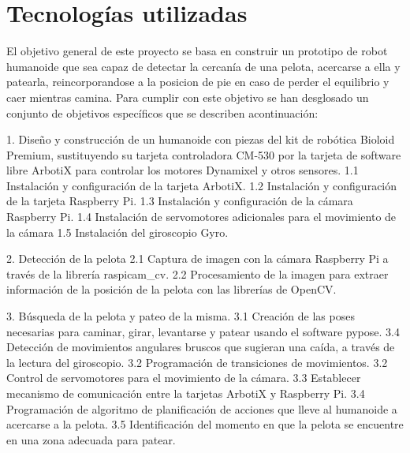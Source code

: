 \chapter{Tecnologías utilizadas}\label{chapter:presentacion_del_problema}

El objetivo general de este proyecto se basa en construir un prototipo de robot humanoide que sea capaz de detectar la cercanía
de una pelota, acercarse a ella y patearla, reincorporandose a la posicion de pie en caso de perder el equilibrio y caer
mientras camina. Para cumplir con este objetivo se han desglosado un conjunto de objetivos específicos que se describen 
acontinuación: 

1. Diseño y construcción de un humanoide con piezas del kit de robótica Bioloid Premium, sustituyendo su tarjeta controladora
CM-530 por la tarjeta de software libre ArbotiX para controlar los motores Dynamixel y otros sensores. 
1.1 Instalación y configuración de la tarjeta ArbotiX.
1.2 Instalación y configuración de la tarjeta Raspberry Pi.
1.3 Instalación y configuración de la cámara Raspberry Pi.
1.4 Instalación de servomotores adicionales para el movimiento de la cámara
1.5 Instalación del giroscopio Gyro.
 
2. Detección de la pelota
2.1 Captura de imagen con la cámara Raspberry Pi a través de la librería raspicam_cv.
2.2 Procesamiento de la imagen para extraer información de la posición de la pelota con las librerías de OpenCV.

3. Búsqueda de la pelota y pateo de la misma. 
3.1 Creación de las poses necesarias para caminar, girar, levantarse y patear usando el software pypose.
3.4 Detección de movimientos angulares bruscos que sugieran una caída, a través de la lectura del giroscopio. 
3.2 Programación de transiciones de movimientos.
3.2 Control de servomotores para el movimiento de la cámara.
3.3 Establecer mecanismo de comunicación entre la tarjetas ArbotiX y Raspberry Pi.  
3.4 Programación de algoritmo de planificación de acciones que lleve al humanoide a acercarse a la pelota.
3.5 Identificación del momento en que la pelota se encuentre en una zona adecuada para patear.

 
